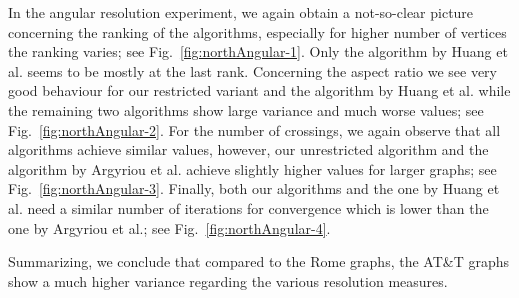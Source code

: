 \documentclass[runningheads]{llncs}
\begin{document}
{In the angular resolution experiment, we again obtain a not-so-clear picture concerning the ranking of the algorithms, especially for higher number of vertices the ranking varies; see Fig.~\ref{fig:northAngular-1}. Only the algorithm by Huang et al. seems to be mostly at the last rank. Concerning the aspect ratio we see very good behaviour for our restricted variant and the algorithm by Huang et al. while the remaining two algorithms show large variance and much worse values; see Fig.~\ref{fig:northAngular-2}. For the number of crossings, we again observe that all algorithms achieve similar values, however, our unrestricted algorithm and the algorithm by Argyriou et al. achieve slightly higher values for larger graphs; see Fig.~\ref{fig:northAngular-3}. Finally, both our algorithms and the one by Huang et al. need a similar number of iterations for convergence which is lower than the one by Argyriou et al.; see Fig.~\ref{fig:northAngular-4}.

Summarizing, we conclude that compared to the Rome graphs, the AT\&T graphs show a much higher variance regarding the various resolution measures. %

\begin{table}[t!]


\end{table}}
\end{document}
